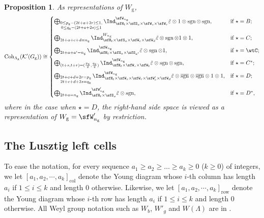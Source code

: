 \documentclass[12pt]{amsart}
\newcommand{\CK}{{\mathcal {K}}}
\newcommand{\sgn}{\operatorname{sgn}}
\numberwithin{equation}{section}
\newtheorem{prop}[thm]{Proposition}
\theoremstyle{remark}
\def\bsgn{\overline{\sgn}}
\def\Coh{\mathrm{Coh}}
\begin{document}
\begin{prop}\label{count004}
As representations of $W_\mathrm g$,
    \[
       \Coh_{\Lambda_\mathrm g}(\CK'(G_\mathrm g)) \cong
        \begin{cases}
     \bigoplus_{\substack{0\leq p_\mathrm g-(2t+a+2r)\leq 1,\\0\leq q_\mathrm g - (2t+a+2s)\leq 1}} \Ind_{\sfH_{t} \times \sfS_{a}\times \sfW_s\times \sfW_r}^{\sfW_{n_\mathrm g}}
         \tilde{\varepsilon} \otimes 1 \otimes \sgn \otimes \sgn, &  \text{if $\star=B$}; \medskip\\
     \bigoplus_{2t+a+c+d=n_\mathrm g}\Ind_{\sfH_{t} \times \sfS_{a} \times \sfW_c\times \sfW_d}^{W_{n_\mathrm g}}\tilde{\varepsilon} \otimes
          \sgn \otimes 1 \otimes 1, &  \text{if $\star =C$};\medskip \\
          \bigoplus_{2t+a+a'=n_\mathrm g}\Ind_{\sfH_{t} \times \sfS_{a} \times \sfS_{a'}}^{\sfW_{n_\mathrm g}}\tilde{\varepsilon} \otimes
          \sgn \otimes 1, &  \text{if $\star =\wtC$};\medskip \\
          \bigoplus_{\substack{(t+s,t+r)=(\frac{p_\mathrm g}{2},\frac{q_\mathrm g}{2})}} \Ind_{\sfH_{t} \times \sfW_s\times \sfW_t}^{\sfW_{n_\mathrm g}}
         \tilde{\varepsilon} \otimes \sgn \otimes \sgn, &  \text{if $\star =C^*$}; \medskip\\
        \bigoplus_{\substack{2t+c+d+2r=p_\mathrm g\\2t+c+d+2s=q_\mathrm g}}
          \Ind_{\sfH_{t} \times \sfW_s\times \sfW_r\times \sfW'_{c}\times \sfW_{d} }^{\sfW_{n_\mathrm g}}\tilde{\varepsilon} \otimes \bsgn \otimes \bsgn \otimes 1\otimes
          1, &  \text{if $\star =D$}; \medskip \\
          \bigoplus_{\substack{2t+a=n_\mathrm g}} \Ind_{\sfH_{t} \times \sfS_{a}}^{\sfW'_{n_\mathrm g}}
         \tilde{\varepsilon} \otimes \sgn, &  \text{if $\star =D^*$}, \\
     \end{cases}
       \]
       where in the case when $\star=D$,  the right-hand side space is viewed as a representation of $W_\mathrm g=\sfW_{n_\mathrm g}'$ by restriction.
      \end{prop}



   \subsection{The Lusztig  left cells}
  \label{sec:LCBCD}

To ease the notation, for every sequence $a_1\geq a_2\geq \dots \geq a_k\geq 0$ ($k\geq 0$) of integers,   we let $[a_1, a_2, \cdots, a_k]_{\mathrm{col}}$ denote the Young diagram
whose $i$-th column has length $a_i$ if $1 \leq i \leq k$ and length $0$
otherwise. Likewise, we let $[a_1, a_2, \cdots, a_k]_{\mathrm{row}}$ denote the Young diagram
whose $i$-th  row has length $a_i$ if $1 \leq i \leq k$ and length $0$ otherwise. All Weyl group notation such as $W_b$, $W'_g$ and
$W(\Lambda)$ are in .
\end{document}

